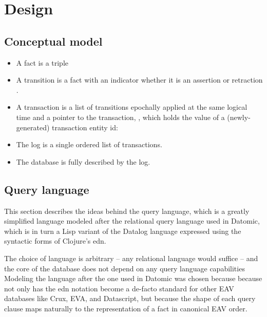 \section{Design}\label{sec:design}







\subsection{Conceptual model}


\begin{itemize}
  \item A fact is a triple \lisp{[e a v]}

  \item A transition is a fact with an indicator whether it is an assertion \lisp{[:+ e a v]} or retraction \lisp{[:- e a v]}.

  \item A transaction is a list of transitions epochally applied at the same logical time and a pointer to the transaction, , which holds the value of a (newly-generated) transaction entity id: \lisp{[[+ ... tx] [- ... tx] [+ ... tx]]}

  \item The log is a single ordered list of transactions.

  \item The database is fully described by the log.

\end{itemize}


\subsection{Query language}

This section describes the ideas behind the query language, which is a greatly simplified language modeled after the relational query language used in Datomic, which is in turn a Lisp variant of the Datalog \cite{abiteboul1988datalog} language expressed using the syntactic forms of Clojure's \gls{edn}.

The choice of language is arbitrary -- any relational language would suffice -- and the core of the database does not depend on any query language capabilities Modeling the language after the one used in Datomic was chosen because because not only has the edn notation become a de-facto standard for other EAV databases like Crux, EVA, and Datascript, but because the shape of each query clause maps naturally to the representation of a fact in canonical EAV order.

